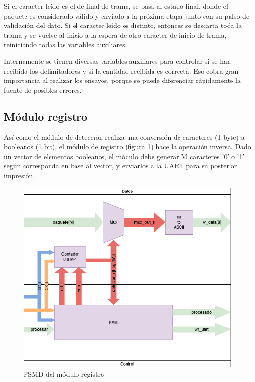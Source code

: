 		Si el caracter leído es el de final de trama, se pasa al estado final, donde el paquete es considerado válido y enviado a la próxima etapa junto con su pulso de validación del dato. Si el caracter leído es distinto, entonces se descarta toda la trama y se vuelve al inicio a la espera de otro caracter de inicio de trama, reiniciando todas las variables auxiliares.
		
		Internamente se tienen diversas variables auxiliares para controlar si se han recibido los delimitadores y si la cantidad recibida es correcta. Eso cobra gran importancia al realizar los ensayos, porque se puede diferenciar rápidamente la fuente de posibles errores.
		
	\subsection{Módulo registro}
	
		Así como el módulo de detección realiza una conversión de caracteres (1 byte) a booleanos (1 bit), el módulo de registro (figura \ref{fig:FSMD_Registro}) hace la operación inversa. Dado un vector de elementos booleanos, el módulo debe generar M caracteres '0' o '1' según corresponda en base al vector, y enviarlos a la UART para su posterior impresión.
		
		\begin{figure}[h]
		\centering
			\includegraphics[scale=.65]{./Figures/FSMD-Registro}
			\caption{FSMD del módulo registro}
			\label{fig:FSMD_Registro}
		\end{figure}

